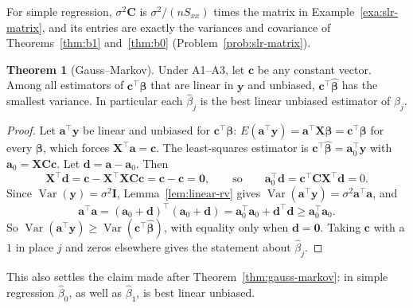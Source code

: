 \documentclass[11pt,a4paper]{article}
\numberwithin{equation}{section}
\theoremstyle{definition}
\newtheorem{thm}{Theorem}[subsection]
\begin{document}
For simple regression, $\sigma^2\mathbf{C}$ is $\sigma^2/(nS_{xx})$ times the matrix in
Example~\ref{exa:slr-matrix}, and its entries are exactly the variances and covariance of
Theorems~\ref{thm:b1} and~\ref{thm:b0} (Problem~\ref{prob:slr-matrix}).

\begin{thm}[Gauss--Markov]\label{thm:gauss-markov-general}
Under A1--A3, let $\mathbf{c}$ be any constant vector. Among all estimators of
$\mathbf{c}^\top\boldsymbol\beta$ that are linear in $\mathbf{y}$ and unbiased,
$\mathbf{c}^\top\hat{\boldsymbol\beta}$ has the smallest variance. In particular each
$\hat\beta_j$ is the best linear unbiased estimator of $\beta_j$.
\end{thm}

\begin{proof}
Let $\mathbf{a}^\top\mathbf{y}$ be linear and unbiased for $\mathbf{c}^\top\boldsymbol\beta$:
$E(\mathbf{a}^\top\mathbf{y}) = \mathbf{a}^\top\mathbf{X}\boldsymbol\beta = \mathbf{c}^\top\boldsymbol\beta$
for every $\boldsymbol\beta$, which forces $\mathbf{X}^\top\mathbf{a} = \mathbf{c}$.
The least-squares estimator is $\mathbf{c}^\top\hat{\boldsymbol\beta} = \mathbf{a}_0^\top\mathbf{y}$
with $\mathbf{a}_0 = \mathbf{X}\mathbf{C}\mathbf{c}$. Let $\mathbf{d} = \mathbf{a} - \mathbf{a}_0$. Then
\[
\mathbf{X}^\top\mathbf{d} = \mathbf{c} - \mathbf{X}^\top\mathbf{X}\mathbf{C}\mathbf{c} = \mathbf{c} - \mathbf{c} = \mathbf{0},
\qquad\text{so}\qquad
\mathbf{a}_0^\top\mathbf{d} = \mathbf{c}^\top\mathbf{C}\mathbf{X}^\top\mathbf{d} = 0 .
\]
Since $\operatorname{Var}(\mathbf{y}) = \sigma^2\mathbf{I}$, Lemma~\ref{lem:linear-rv} gives
$\operatorname{Var}(\mathbf{a}^\top\mathbf{y}) = \sigma^2\mathbf{a}^\top\mathbf{a}$, and
\[
\mathbf{a}^\top\mathbf{a} = (\mathbf{a}_0 + \mathbf{d})^\top(\mathbf{a}_0 + \mathbf{d})
= \mathbf{a}_0^\top\mathbf{a}_0 + \mathbf{d}^\top\mathbf{d} \ge \mathbf{a}_0^\top\mathbf{a}_0 .
\]
So $\operatorname{Var}(\mathbf{a}^\top\mathbf{y}) \ge \operatorname{Var}(\mathbf{c}^\top\hat{\boldsymbol\beta})$,
with equality only when $\mathbf{d} = \mathbf{0}$. Taking $\mathbf{c}$ with a $1$ in place $j$
and zeros elsewhere gives the statement about $\hat\beta_j$.
\end{proof}

This also settles the claim made after Theorem~\ref{thm:gauss-markov}: in simple regression
$\hat\beta_0$, as well as $\hat\beta_1$, is best linear unbiased.
\end{document}
